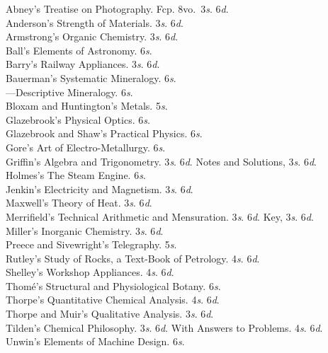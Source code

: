 \documentclass[letterpaper,12pt,oneside,openany]{memoir}
\newcommand{\E}{\hspace*{2mm}---\hspace*{2mm}}
\begin{document}
\begin{footnotesize}
Abney's Treatise on Photography. Fcp. 8vo.\ 3\textit{s}. 6\textit{d}.\\
Anderson's Strength of Materials. 3\textit{s}. 6\textit{d}.\\
Armstrong's Organic Chemistry. 3\textit{s}. 6\textit{d}.\\
Ball's Elements of Astronomy. 6\textit{s}.                  \\
Barry's Railway Appliances. 3\textit{s}. 6\textit{d}.                 \\
Bauerman's Systematic Mineralogy. 6\textit{s}.\\
\E Descriptive Mineralogy. 6\textit{s}.\\
Bloxam and Huntington's Metals. 5\textit{s}.\\
Glazebrook's Physical Optics. 6\textit{s}.\\
Glazebrook and Shaw's Practical Physics. 6\textit{s}.\\
Gore's Art of Electro-Metallurgy. 6\textit{s}.\\
Griffin's Algebra and Trigonometry. 3\textit{s}. 6\textit{d}. Notes and Solutions, 3\textit{s}. 6\textit{d}.\\
Holmes's The Steam Engine. 6\textit{s}.\\
Jenkin's Electricity and Magnetism. 3\textit{s}. 6\textit{d}.\\
Maxwell's Theory of Heat. 3\textit{s}. 6\textit{d}.\\
Merrifield's Technical Arithmetic and Mensuration. 3\textit{s}. 6\textit{d}. Key, 3\textit{s}. 6\textit{d}.\\
Miller's Inorganic Chemistry. 3\textit{s}. 6\textit{d}.\\
Preece and Sivewright's Telegraphy. 5\textit{s}.\\
Rutley's Study of Rocks, a Text-Book of Petrology. 4\textit{s}. 6\textit{d}.\\
Shelley's Workshop Appliances. 4\textit{s}. 6\textit{d}.\\
Thom{\'e}'s Structural and Physiological Botany. 6\textit{s}.\\
Thorpe's Quantitative Chemical Analysis. 4\textit{s}. 6\textit{d}.\\
Thorpe and Muir's Qualitative Analysis. 3\textit{s}. 6\textit{d}.\\
Tilden's Chemical Philosophy. 3\textit{s}. 6\textit{d}. With Answers to Problems. 4\textit{s}. 6\textit{d}.\\
Unwin's Elements of Machine Design. 6\textit{s}.\\

\end{footnotesize}
\end{document}
